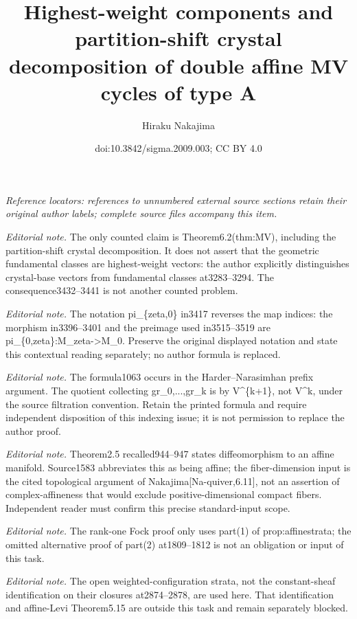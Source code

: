 \documentclass[10pt,a4paper]{amsart}
\title{Highest-weight components and partition-shift crystal decomposition of double affine MV cycles of type A}
\author{Hiraku Nakajima}
\date{doi:10.3842/sigma.2009.003; CC BY 4.0}
\theoremstyle{definition}
\numberwithin{equation}{section}
\begin{document}
\noindent\textit{Reference locators: references to unnumbered external source sections retain their original author labels; complete source files accompany this item.}\par
\maketitle
\noindent\textit{Editorial note.} The only counted claim is Theorem6.2(thm:MV), including the partition-shift crystal decomposition. It does not assert that the geometric fundamental classes are highest-weight vectors: the author explicitly distinguishes crystal-base vectors from fundamental classes at3283–3294. The consequence3432–3441 is not another counted problem.\par\medskip
\noindent\textit{Editorial note.} The notation pi\_\{zeta,0\} in3417 reverses the map indices: the morphism in3396–3401 and the preimage used in3515–3519 are pi\_\{0,zeta\}:M\_zeta->M\_0. Preserve the original displayed notation and state this contextual reading separately; no author formula is replaced.\par\medskip
\noindent\textit{Editorial note.} The formula1063 occurs in the Harder–Narasimhan prefix argument. The quotient collecting gr\_0,...,gr\_k is by V\textasciicircum{}\{k+1\}, not V\textasciicircum{}k, under the source filtration convention. Retain the printed formula and require independent disposition of this indexing issue; it is not permission to replace the author proof.\par\medskip
\noindent\textit{Editorial note.} Theorem2.5 recalled944–947 states diffeomorphism to an affine manifold. Source1583 abbreviates this as being affine; the fiber-dimension input is the cited topological argument of Nakajima[Na-quiver,6.11], not an assertion of complex-affineness that would exclude positive-dimensional compact fibers. Independent reader must confirm this precise standard-input scope.\par\medskip
\noindent\textit{Editorial note.} The rank-one Fock proof only uses part(1) of prop:affinestrata; the omitted alternative proof of part(2) at1809–1812 is not an obligation or input of this task.\par\medskip
\noindent\textit{Editorial note.} The open weighted-configuration strata, not the constant-sheaf identification on their closures at2874–2878, are used here. That identification and affine-Levi Theorem5.15 are outside this task and remain separately blocked.\par\medskip
\end{document}
